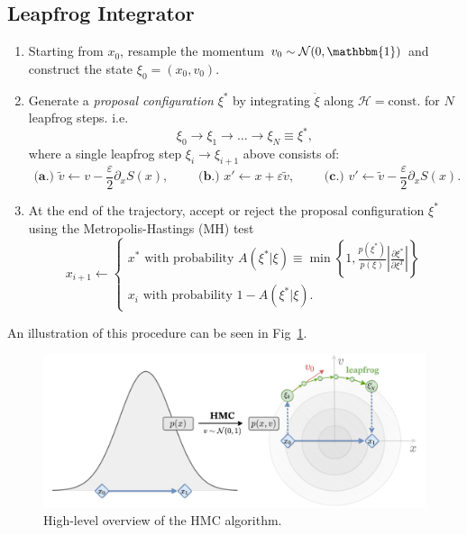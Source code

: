 \documentclass[a4paper,11pt]{article}
\newcommand{\acceptProb}{%
            A(\xi^{\ast}|\xi) \equiv \min\left\{1,
            \frac{p(\xi^{\ast})}{p(\xi)}%
        \left|\frac{\partial \xi^{\ast}}{\partial \xi^{T}}\right|\right\}
    }
\begin{document}
\subsection{\label{subsec:lfint}Leapfrog Integrator}
%
\begin{enumerate}
    \item Starting from \(x_{0}\), resample the momentum \(v_{0}\sim
        \mathcal{N} (0, \mathbbm{1})\) and construct the state \(\xi_{0} =
        (x_{0}, v_{0})\).
    \item Generate a \emph{proposal configuration} \(\xi^{\ast}\) by
        integrating \(\dot\xi\) along \(\mathcal{H} = \mathrm{const.}\)
        for \(N\) leapfrog steps.
        i.e.
        \begin{equation}
            \xi_{0}\rightarrow \xi_{1}\rightarrow\ldots\rightarrow
            \xi_{N} \equiv \xi^{\ast},
        \end{equation}
        where a single leapfrog step \(\xi_{i} \rightarrow \xi_{i+1}\) above
        consists of: 
        \begin{equation}
            \textbf{ (a.) }%
              \tilde{v}\leftarrow v - \frac{\varepsilon}{2}\partial_{x} S(x),
            \quad\quad
            \textbf{ (b.) }%
              x' \leftarrow x + \varepsilon \tilde{v},
            \quad\quad
            \textbf{ (c.) }%
              v' \leftarrow \tilde{v} - \frac{\varepsilon}{2}\partial_{x} S(x).
        \end{equation}
    \item At the end of the trajectory, accept or reject the proposal
        configuration \(\xi^{\ast}\) using the Metropolis-Hastings (MH) test
        \begin{equation}
            x_{i+1} \leftarrow
            \begin{cases}
                x^{\ast}\text{ with probability } \acceptProb \\
                x_{i}\text{ with probability } 1 - A(\xi^{\ast}|\xi).
            \end{cases}
        \end{equation}
\end{enumerate}
%
An illustration of this procedure can be seen in Fig~\ref{fig:hmc}.
%
\begin{figure}[htpb]
    \centering
    \includegraphics[width=\textwidth]{assets/hmc.pdf}
    \caption{\label{fig:hmc}High-level overview of the HMC algorithm.}
\end{figure}
%
\end{document}
